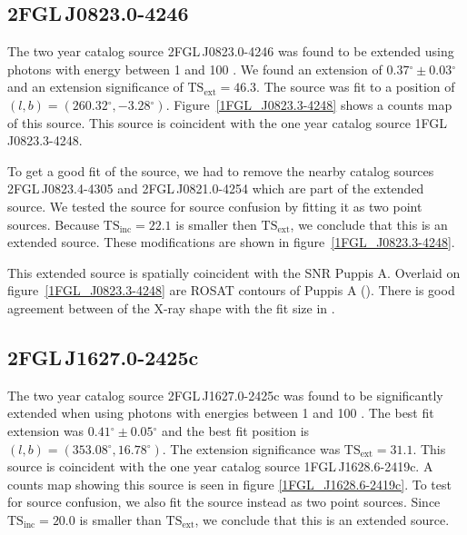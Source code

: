 \documentclass[12pt,preprint]{aastex}
\newcommand{\gev}{\text{GeV}\xspace}
\newcommand{\tsext}{{\ensuremath{\text{TS}_\text{ext}}}\xspace}
\newcommand{\tsinc}{\ensuremath{\text{TS}_\text{inc}}\xspace}
\renewcommand{\deg}{\ensuremath{^\circ}\xspace}
\begin{document}
\subsection{2FGL\,J0823.0-4246}
\label{section_2FGL_J0823.0-4246}


The two year catalog source 2FGL\,J0823.0-4246 was found to be
extended using photons with energy between 1 \gev and 100 \gev.
We found an extension of $0.37\deg\pm0.03\deg$ and an extension
significance of $\tsext=46.3$.  The source was fit to a position of
$(l,b)=(260.32\deg,-3.28\deg)$.  Figure~\ref{1FGL_J0823.3-4248} shows a
counts map of this source.  This source is coincident with the one year
catalog source 1FGL\,J0823.3-4248.

To get a good fit of the source, we had to remove the nearby catalog
sources 2FGL\,J0823.4-4305 and 2FGL\,J0821.0-4254 which are part of the
extended source.  We tested the source for source confusion by fitting
it as two point sources. Because $\tsinc=22.1$ is smaller then \tsext,
we conclude that this is an extended source.  
These modifications are shown in
figure~\ref{1FGL_J0823.3-4248}.

This extended source is spatially coincident with the SNR Puppis A.
Overlaid on figure~\ref{1FGL_J0823.3-4248} are ROSAT contours of Puppis
A (\cite{rosat_puppis_a}). There is good agreement between of the X-ray
shape with the fit size in \gev.


\subsection{2FGL\,J1627.0-2425c}
\label{section_2FGL_J1627.0-2425c}


The two year catalog source 2FGL\,J1627.0-2425c was found to be
significantly extended when using photons with energies between 1 \gev
and 100 \gev.  The best fit extension was $0.41\deg\pm0.05\deg$ and the
best fit position is $(l,b)=(353.08\deg, 16.78\deg)$.
The extension significance was $\tsext=31.1$. 
This source is coincident with the one year catalog source 1FGL\,J1628.6-2419c.
A counts map showing this source is
seen in figure \ref{1FGL_J1628.6-2419c}.  To test for source confusion,
we also fit the source instead as two point sources. Since $\tsinc=20.0$
is smaller than \tsext, we conclude that this is an extended source.
\end{document}
